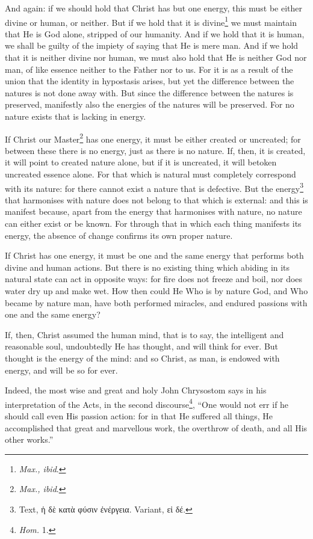 And again: if we should hold that Christ has but one energy, this must be either divine or human, or neither. But if we hold that it is divine\footnote{\emph{Max., ibid}.} we must maintain that He is God alone, stripped of our humanity. And if we hold that it is human, we shall be guilty of the impiety of saying that He is mere man. And if we hold that it is neither divine nor human, we must also hold that He is neither God nor man, of like essence neither to the Father nor to us. For it is as a result of the union that the identity in hypostasis arises, but yet the difference between the natures is not done away with. But since the difference between the natures is preserved, manifestly also the energies of the natures will be preserved. For no nature exists that is lacking in energy.

If Christ our Master\footnote{\emph{Max., ibid}.} has one energy, it must be either created or uncreated; for between these there is no energy, just as there is no nature. If, then, it is created, it will point to created nature alone, but if it is uncreated, it will betoken uncreated essence alone. For that which is natural must completely correspond with its nature: for there cannot exist a nature that is defective. But the energy\footnote{Text, \textgreek{ἡ δὲ κατὰ φύσιν ἐνέργεια}. Variant, \textgreek{εἰ δέ}.} that harmonises with nature does not belong to that which is external: and this is manifest because, apart from the energy that harmonises with nature, no nature can either exist or be known. For through that in which each thing manifests its energy, the absence of change confirms its own proper nature.

If Christ has one energy, it must be one and the same energy that performs both divine and human actions. But there is no existing thing which abiding in its natural state can act in opposite ways: for fire does not freeze and boil, nor does water dry up and make wet. How then could He Who is by nature God, and Who became by nature man, have both performed miracles, and endured passions with one and the same energy?

If, then, Christ assumed the human mind, that is to say, the intelligent and reasonable soul, undoubtedly He has thought, and will think for ever. But thought is the energy of the mind: and so Christ, as man, is endowed with energy, and will be so for ever.

Indeed, the most wise and great and holy John Chrysostom says in his interpretation of the Acts, in the second discourse\footnote{\emph{Hom. }1.}, “One would not err if he should call even His passion action: for in that He suffered all things, He accomplished that great and marvellous work, the overthrow of death, and all His other works.”

